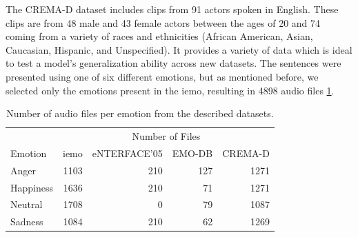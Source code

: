 The CREMA-D dataset includes clips from 91 actors spoken in English. These clips are from 48 male and 43 female actors between the ages of 20 and 74 coming from a variety of races and ethnicities (African American, Asian, Caucasian, Hispanic, and Unspecified). It provides a variety of data which is ideal to test a model's generalization ability across new datasets. The sentences were presented using one of six different emotions, but as mentioned before, we selected only the emotions present in the \ac{iemo}, resulting in 4898 audio files \ref{tab:all_datasets}. 



\begin{table}[H]
	\centering
	\caption{Number of audio files per emotion from the described datasets.}
	\label{tab:all_datasets}
	\begin{tabular}{lrrrr}
		\toprule
		& \multicolumn{4}{c}{Number of Files} \\
		\cmidrule{2-5}
		Emotion     &   \ac{iemo} & eNTERFACE'05 & EMO-DB & CREMA-D \\
		\midrule
		Anger   	&         1103 &  210 & 127 & 1271 \\
		Happiness   &         1636 &  210 &  71 & 1271 \\
		Neutral		&         1708 &    0 &  79 & 1087 \\
		Sadness     &         1084 &  210 &  62 & 1269 \\
		\bottomrule
	\end{tabular}
\end{table}


